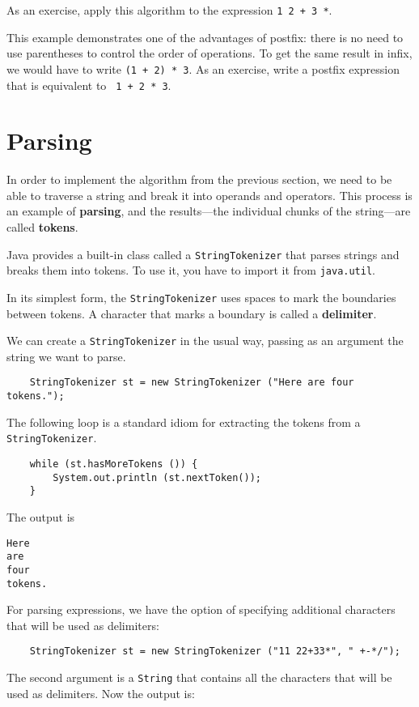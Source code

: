 As an exercise, apply this algorithm to the expression
{\tt 1 2 + 3 *}.

This example demonstrates one of the advantages of postfix: there is
no need to use parentheses to control the order of operations.  To get
the same result in infix, we would have to write {\tt (1 + 2) * 3}.
As an exercise, write a postfix expression that is equivalent to {\tt
1 + 2 * 3}.


\section {Parsing}

In order to implement the algorithm from the previous section,
we need to be able to traverse a string and break it into operands
and operators.  This process is an example of {\bf parsing}, and
the results---the individual chunks of the string---are called
{\bf tokens}.

Java provides a built-in class called a {\tt StringTokenizer}
that parses strings and breaks them into tokens.  To use it, you
have to import it from {\tt java.util}.

In its simplest form, the {\tt StringTokenizer} uses spaces
to mark the boundaries between tokens.  A character that marks
a boundary is called a {\bf delimiter}.

We can create a {\tt StringTokenizer} in the usual way, passing
as an argument the string we want to parse.

\begin{verbatim}
    StringTokenizer st = new StringTokenizer ("Here are four tokens.");
\end{verbatim}
%
The following loop is a standard idiom for extracting the tokens
from a {\tt StringTokenizer}.

\begin{verbatim}
    while (st.hasMoreTokens ()) {
        System.out.println (st.nextToken());
    }
\end{verbatim}
%
The output is

\begin{verbatim}
Here
are
four
tokens.
\end{verbatim}
%
For parsing expressions, we have the option of specifying additional
characters that will be used as delimiters:

\begin{verbatim}
    StringTokenizer st = new StringTokenizer ("11 22+33*", " +-*/");
\end{verbatim}
%
The second argument is a {\tt String} that contains all the characters
that will be used as delimiters.  Now the output is:

